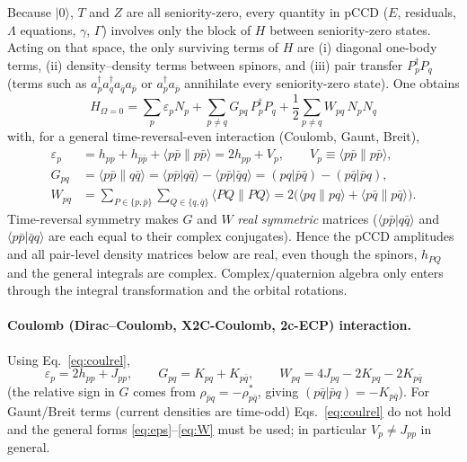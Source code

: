 \documentclass[11pt,a4paper]{article}
\newcommand{\kb}[1]{\bar{#1}}                 %
\newcommand{\Pd}[1]{P^{\dagger}_{#1}}
\newcommand{\Pa}[1]{P_{#1}}
\newcommand{\asym}[4]{\langle #1 #2 \| #3 #4 \rangle}
\newcommand{\dir}[4]{\langle #1 #2 | #3 #4 \rangle}
\begin{document}
Because $|0\rangle$, $T$ and $Z$ are all seniority-zero, every quantity in pCCD
($E$, residuals, $\Lambda$ equations, $\gamma$, $\Gamma$) involves only the block of $H$ between
seniority-zero states. Acting on that space, the only surviving terms of $H$ are
(i) diagonal one-body terms, (ii) density--density terms between spinors, and
(iii) pair transfer $\Pd p\Pa q$ (terms such as $a^\dagger_p a^\dagger_q a_{\kb q} a_{\kb p}$ or
$a^\dagger_p a_{\kb p}$ annihilate every seniority-zero state). One obtains
\begin{equation}
  \boxed{\;
  H_{\Omega=0}=\sum_p \varepsilon_p N_p+\sum_{p\neq q} G_{pq}\,\Pd p\Pa q
  +\frac12\sum_{p\neq q} W_{pq}\,N_pN_q \;}
  \label{eq:Hsz}
\end{equation}
with, for a general time-reversal-even interaction (Coulomb, Gaunt, Breit),
\begin{align}
  \varepsilon_p &= h_{pp}+h_{\kb p\kb p}+\asym p{\kb p}p{\kb p}
     = 2h_{pp}+V_p, \qquad V_p\equiv\asym p{\kb p}p{\kb p}, \label{eq:eps}\\
  G_{pq} &= \asym p{\kb p}q{\kb q} = \dir p{\kb p}q{\kb q}-\dir p{\kb p}{\kb q}q
          = (pq|\kb p\kb q)-(p\kb q|\kb p q), \label{eq:G}\\
  W_{pq} &= \sum_{P\in\{p,\kb p\}}\sum_{Q\in\{q,\kb q\}}\asym PQPQ
          = 2\bigl(\asym pqpq+\asym p{\kb q}p{\kb q}\bigr). \label{eq:W}
\end{align}
Time-reversal symmetry makes $G$ and $W$ \emph{real symmetric} matrices
($\dir p{\kb p}q{\kb q}$ and $\dir p{\kb p}{\kb q}q$ are each equal to their complex conjugates).
Hence the pCCD amplitudes and all pair-level density matrices below are real, even though the
spinors, $h_{PQ}$ and the general integrals are complex. Complex/quaternion algebra only enters through
the integral transformation and the orbital rotations.

\paragraph{Coulomb (Dirac--Coulomb, X2C-Coulomb, 2c-ECP) interaction.} Using Eq.~\eqref{eq:coulrel},
\begin{equation}
  \boxed{\;
  \varepsilon_p=2h_{pp}+J_{pp},\qquad
  G_{pq}=K_{pq}+K_{p\kb q},\qquad
  W_{pq}=4J_{pq}-2K_{pq}-2K_{p\kb q}\;}
  \label{eq:coulomb}
\end{equation}
(the relative sign in $G$ comes from $\rho_{\kb p q}=-\rho_{p\kb q}^{*}$, giving $(p\kb q|\kb p q)=-K_{p\kb q}$).
For Gaunt/Breit terms (current densities are time-odd) Eqs.~\eqref{eq:coulrel} do not hold and the
general forms \eqref{eq:eps}--\eqref{eq:W} must be used; in particular $V_p\neq J_{pp}$ in general.
\end{document}

